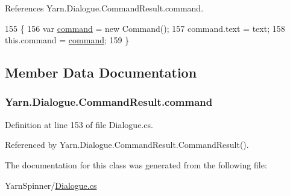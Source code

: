 References Yarn.\-Dialogue.\-Command\-Result.\-command.


\begin{DoxyCode}
155                                                \{
156                 var \hyperlink{a00049_a420ca0984d6e5c33bb761654305c592e}{command} = \textcolor{keyword}{new} Command();
157                 command.text = text;
158                 this.command = \hyperlink{a00049_a420ca0984d6e5c33bb761654305c592e}{command};
159             \}
\end{DoxyCode}


\subsection{Member Data Documentation}
\hypertarget{a00049_a420ca0984d6e5c33bb761654305c592e}{
\subsubsection[{command}]{ Yarn.\-Dialogue.\-Command\-Result.\-command}}\label{a00049_a420ca0984d6e5c33bb761654305c592e}


Definition at line 153 of file Dialogue.\-cs.



Referenced by Yarn.\-Dialogue.\-Command\-Result.\-Command\-Result().



The documentation for this class was generated from the following file\-:\begin{DoxyCompactItemize}
\item 
Yarn\-Spinner/\hyperlink{a00282}{Dialogue.\-cs}\end{DoxyCompactItemize}

